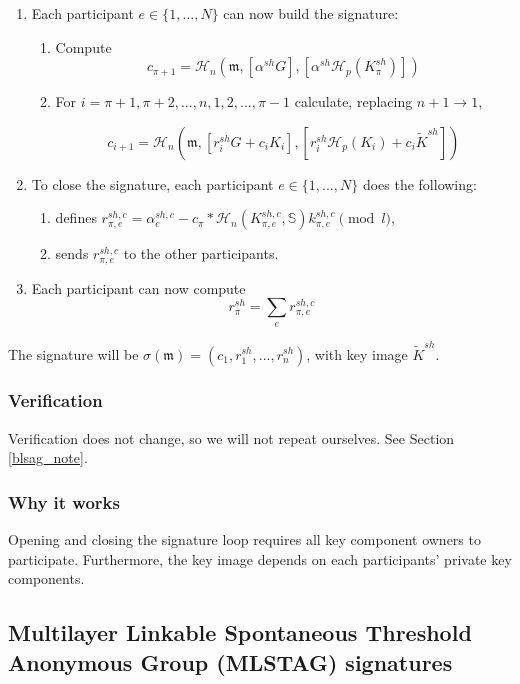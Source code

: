 \begin{enumerate}
	\item Each participant $e \in \{1,...,N\}$ can now build the signature:
	\begin{enumerate}
	    \item Compute
    	\[c_{\pi+1} = \mathcal{H}_n(\mathfrak{m}, [\alpha^{sh} G], [\alpha^{sh} \mathcal{H}_p(K^{sh}_\pi)])\]
    	\item For \(i = \pi+1, \pi+2, ..., n, 1, 2, ..., \pi-1\) calculate, replacing \(n + 1 \rightarrow 1\),
    	
    	\[  c_{i+1} = \mathcal{H}_n(\mathfrak{m}, [r^{sh}_i G + c_i K_i], [r^{sh}_i \mathcal{H}_p(K_i) + c_i \tilde{K}^{sh}])  \]
	\end{enumerate}
	
	\item To close the signature, each participant $e \in \{1,...,N\}$ does the following:
	\begin{enumerate}
	    \item defines \(r^{sh,c}_{\pi,e} = \alpha^{sh,c}_e - c_\pi*\mathcal{H}_n(K^{sh,c}_{\pi,e},\mathbb{S})k^{sh,c}_{\pi,e} \pmod l\),
	    \item sends $r^{sh,c}_{\pi,e}$ to the other participants.
	\end{enumerate}
	
	\item Each participant can now compute
	\[ r^{sh}_\pi = \sum_e r^{sh,c}_{\pi,e} \]
\end{enumerate}

The signature will be \(\sigma(\mathfrak{m}) = (c_1, r^{sh}_1, ..., r^{sh}_n) \), with key image $\tilde{K}^{sh}$.

\subsubsection*{Verification}

Verification does not change, so we will not repeat ourselves. See Section \ref{blsag_note}.

\subsubsection*{Why it works}

Opening and closing the signature loop requires all key component owners to participate. Furthermore, the key image depends on each participants' private key components.


\subsection{Multilayer Linkable Spontaneous Threshold Anonymous Group (MLSTAG) signatures}
\label{sec:MLSTAG}

